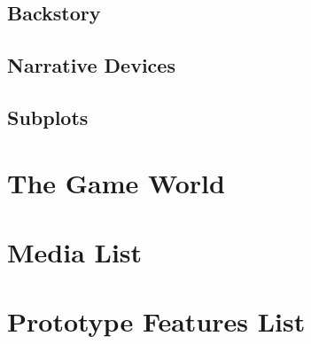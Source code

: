 \documentclass[12pt]{article}
\begin{document}
\subsection{Backstory}

\subsection{Narrative Devices}

\subsection{Subplots}

\newpage

\section{The Game World}

\newpage

\section{Media List}

\newpage

\section{Prototype Features List}
\end{document}
